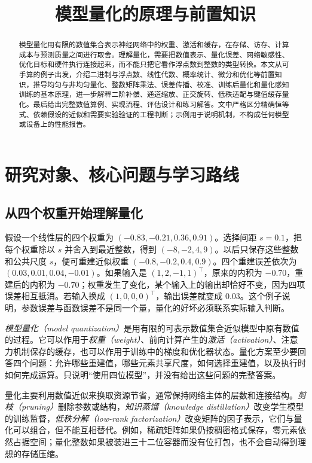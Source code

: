 \documentclass[UTF8,12pt,a4paper,fontset=fandol]{ctexart}
\title{模型量化的原理与前置知识}
\author{}
\date{}
\begin{document}
\maketitle

\begin{abstract}
模型量化用有限的数值集合表示神经网络中的权重、激活和缓存，在存储、访存、计算成本与预测质量之间进行取舍。理解量化，需要把数值表示、量化误差、网络敏感性、优化目标和硬件执行连接起来，而不能只把它看作浮点数到整数的类型转换。本文从可手算的例子出发，介绍二进制与浮点数、线性代数、概率统计、微分和优化等前置知识，推导均匀与非均匀量化、整数矩阵乘法、误差传播、校准、训练后量化和量化感知训练的基本原理，进一步解释二阶补偿、通道缩放、正交旋转、低秩适配与键值缓存量化。最后给出完整数值算例、实现流程、评估设计和练习解答。文中严格区分精确恒等式、依赖假设的近似和需要实验验证的工程判断；示例用于说明机制，不构成任何模型或设备上的性能报告。
\end{abstract}
\tableofcontents

\section{研究对象、核心问题与学习路线}
\label{sec:quant-intro}

\subsection{从四个权重开始理解量化}
假设一个线性层的四个权重为 $(-0.83,-0.21,0.36,0.91)$。选择间距 $s=0.1$，把每个权重除以 $s$ 并舍入到最近整数，得到 $(-8,-2,4,9)$。以后只保存这些整数和公共尺度 $s$，便可重建近似权重 $(-0.8,-0.2,0.4,0.9)$。四个重建误差依次为 $(0.03,0.01,0.04,-0.01)$。如果输入是 $(1,2,-1,1)^\top$，原来的内积为 $-0.70$，重建后的内积为 $-0.70$；权重发生了变化，某个输入上的输出却恰好不变，因为四项误差相互抵消。若输入换成 $(1,0,0,0)^\top$，输出误差就变成 $0.03$。这个例子说明，参数误差与函数误差不是同一个量，量化的好坏必须联系实际输入判断。

\emph{模型量化（model quantization）}是用有限的可表示数值集合近似模型中原有数值的过程。它可以作用于\emph{权重（weight）}、前向计算产生的\emph{激活（activation）}、注意力机制保存的缓存，也可以作用于训练中的梯度和优化器状态。量化方案至少要回答四个问题：允许哪些重建值，哪些元素共享尺度，如何选择重建值，以及执行时如何完成运算。只说明“使用四位模型”，并没有给出这些问题的完整答案。

量化主要利用数值近似来换取资源节省，通常保持网络主体的层数和连接结构。\emph{剪枝（pruning）}删除参数或结构，\emph{知识蒸馏（knowledge distillation）}改变学生模型的训练监督，\emph{低秩分解（low-rank factorization）}改变矩阵的因子表示，它们与量化可以组合，但不能互相替代。例如，稀疏矩阵如果仍按稠密格式保存，零元素依然占据空间；量化整数如果被装进三十二位容器而没有位打包，也不会自动得到理想的存储压缩。
\end{document}
